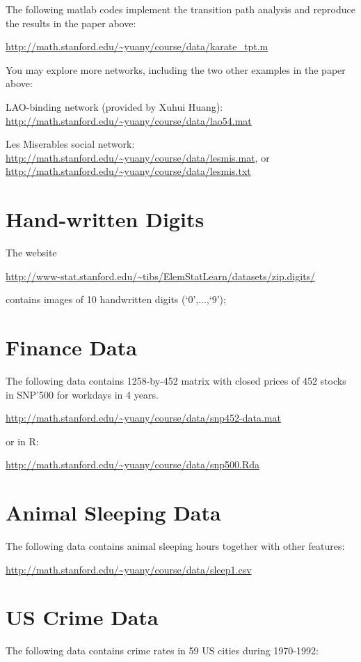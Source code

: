 \documentclass[11pt]{article}
\begin{document}
The following matlab codes implement the transition path analysis and reproduce the results in the paper above:

\url{http://math.stanford.edu/~yuany/course/data/karate_tpt.m}

You may explore more networks, including the two other examples in the paper above:

LAO-binding network (provided by Xuhui Huang): \url{http://math.stanford.edu/~yuany/course/data/lao54.mat}

Les Miserables social network: \url{http://math.stanford.edu/~yuany/course/data/lesmis.mat}, or \url{http://math.stanford.edu/~yuany/course/data/lesmis.txt}

\section{Hand-written Digits} The website 

\url{http://www-stat.stanford.edu/\~tibs/ElemStatLearn/datasets/zip.digits/}

\noindent contains images of 10 handwritten digits (`$0$',...,`9');

\section{Finance Data}
The following data contains 1258-by-452 matrix with closed prices of 452 stocks in SNP'500 for workdays in 4 years.

\url{http://math.stanford.edu/~yuany/course/data/snp452-data.mat} 

\noindent or in R: 

\url{http://math.stanford.edu/~yuany/course/data/snp500.Rda}


\section{Animal Sleeping Data} The following data contains animal sleeping hours together with other features: 

\url{http://math.stanford.edu/~yuany/course/data/sleep1.csv}


\section{US Crime Data} The following data contains crime rates in 59 US cities during 1970-1992:
\end{document}
